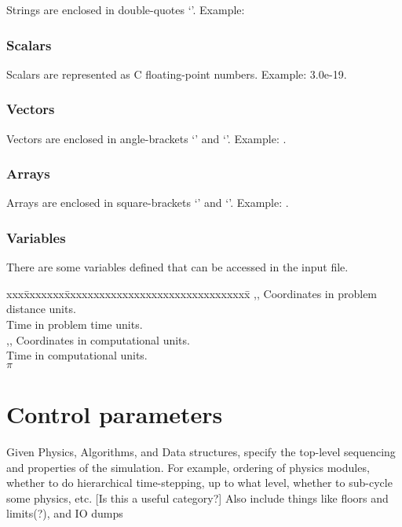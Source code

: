 \documentclass{book}
\begin{document}
Strings are enclosed in double-quotes `'.  Example: 

\subsubsection{Scalars}

Scalars are represented as C floating-point numbers.  Example: 3.0e-19.

\subsubsection{Vectors} 

Vectors are enclosed in angle-brackets `\code{$<$}' and `\code{$>$}'.  Example: .

\subsubsection{Arrays} 

Arrays are enclosed in square-brackets `\code{[}' and `\code{]}'.  Example: \code{[3e9,$<$3,4,5$>$, "density"]}.

\subsubsection{Variables} 

There are some variables defined that can be accessed in the input file.
\begin{tabbing}
xxx\=xxxxxxx\=xxxxxxxxxxxxxxxxxxxxxxxxxxxxxxxx\=\kill
\> ,, \> Coordinates in problem distance units. \\
\>  \> Time in problem time units. \\
\> ,, \> Coordinates in computational units. \\
\>  \> Time in computational units. \\
\>  \> $\pi$ \\
\end{tabbing}

\section{Control parameters} \label{s:control}

Given Physics, Algorithms, and Data structures, specify the top-level
sequencing and properties of the simulation.  For example, ordering of
physics modules, whether to do hierarchical time-stepping, up to what
level, whether to sub-cycle some physics, etc. [Is this a useful
category?]  Also include things like floors and limits(?), and IO
dumps
\end{document}
